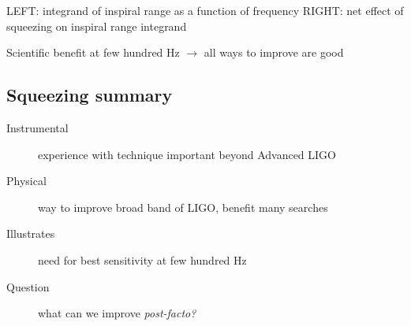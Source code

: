 

LEFT: integrand of inspiral range as a function of frequency
RIGHT: net effect of squeezing on inspiral range integrand

Scientific benefit at few hundred Hz $\rightarrow$ all ways to improve
are good



\subsection{Squeezing summary}

\begin{description}
\item [{Instrumental}] experience with technique important beyond Advanced
LIGO
\item [{Physical}] way to improve broad band of LIGO, benefit many searches
\item [{Illustrates}] need for best sensitivity at few hundred Hz
\item [{Question}] what can we improve \emph{post-facto?}
\end{description}


%
%
%


